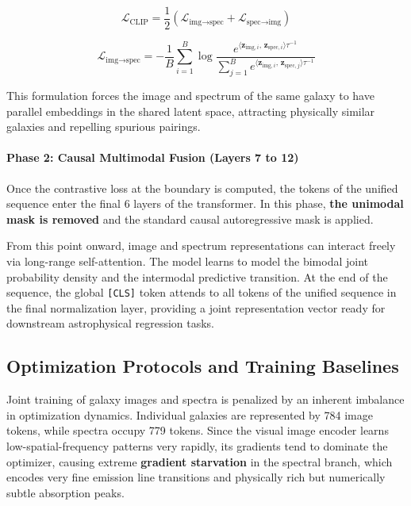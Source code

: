 \begin{equation}
\mathcal{L}_{\text{CLIP}} = \dfrac{1}{2} \left( \mathcal{L}_{\text{img}\to\text{spec}} + \mathcal{L}_{\text{spec}\to\text{img}} \right)
\label{eq:clip_loss}
\end{equation}

\begin{equation}
\mathcal{L}_{\text{img}\to\text{spec}} = -\dfrac{1}{B} \sum_{i=1}^B \log \dfrac{e^{\langle\mathbf{z}_{\text{img}, i},\,\mathbf{z}_{\text{spec}, i}\rangle \tau^{-1}}}{\sum_{j=1}^B e^{\langle\mathbf{z}_{\text{img}, i},\,\mathbf{z}_{\text{spec}, j}\rangle \tau^{-1}}}
\label{eq:loss_img_to_spec}
\end{equation}

This formulation forces the image and spectrum of the same galaxy to have parallel embeddings in the shared latent space, attracting physically similar galaxies and repelling spurious pairings.

\paragraph{Phase 2: Causal Multimodal Fusion (Layers 7 to 12)}

Once the contrastive loss at the boundary is computed, the tokens of the unified sequence enter the final 6 layers of the transformer. In this phase, \textbf{the unimodal mask is removed} and the standard causal autoregressive mask is applied.

From this point onward, image and spectrum representations can interact freely via long-range self-attention. The model learns to model the bimodal joint probability density and the intermodal predictive transition. At the end of the sequence, the global \texttt{[CLS]} token attends to all tokens of the unified sequence in the final normalization layer, providing a joint representation vector ready for downstream astrophysical regression tasks.

\subsection{Optimization Protocols and Training Baselines}

Joint training of galaxy images and spectra is penalized by an inherent imbalance in optimization dynamics. Individual galaxies are represented by 784 image tokens, while spectra occupy 779 tokens. Since the visual image encoder learns low-spatial-frequency patterns very rapidly, its gradients tend to dominate the optimizer, causing extreme \textbf{gradient starvation} in the spectral branch, which encodes very fine emission line transitions and physically rich but numerically subtle absorption peaks.

